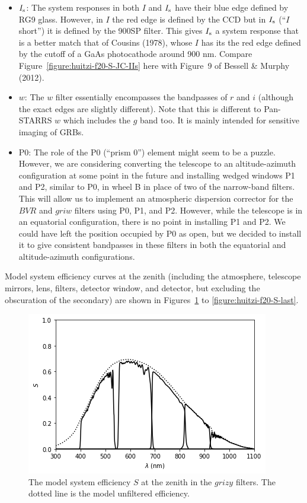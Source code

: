 \begin{itemize}
\item $\mbox{$I_\mathrm{s}$}$: The system responses in both $I$ and $\mbox{$I_\mathrm{s}$}$ have their blue edge defined by RG9 glass. However, in $I$ the red edge is defined by the CCD but in $\mbox{$I_\mathrm{s}$}$ (“$I$ short”) it is defined by the 900SP filter. This gives $\mbox{$I_\mathrm{s}$}$ a system response that is a better match that of Cousins (1978), whose $I$ has its the red edge defined by the cutoff of a GaAs photocathode around 900 nm. Compare Figure~\ref{figure:huitzi-f20-S-JC-IIs} here with Figure~9 of Bessell \& Murphy (2012).

\item
$w$: The $w$ filter essentially encompasses the bandpasses of $r$ and $i$ (although the exact edges are slightly different). Note that this is different to Pan-STARRS $w$ which includes the $g$ band too. It is mainly intended for sensitive imaging of GRBs.

\item P0: The role of the P0 (“prism 0”) element might seem to be a puzzle. However, we are considering converting the telescope to an altitude-azimuth configuration at some point in the future and installing wedged windows P1 and P2, similar to P0, in wheel B in place of two of the narrow-band filters. This will allow us to implement an atmospheric dispersion corrector  for the $BVR$ and $griw$ filters using P0, P1, and P2. However, while the telescope is in an equatorial configuration, there is no point in installing P1 and P2. We could have left the position occupied by P0 as open, but we decided to install it to give consistent bandpasses in these filters in both the equatorial and altitude-azimuth configurations.

\end{itemize}

Model system efficiency curves at the zenith (including the atmosphere, telescope mirrors, lens, filters, detector window, and detector, but excluding the obscuration of the secondary) are shown in Figures~\ref{figure:huitzi-f20-S-first} to \ref{figure:huitzi-f20-S-last}.

\begin{figure}
\begin{center}
\includegraphics[width=0.7\linewidth]{figures/huitzi-f20-S-grizy.png}
\medskip
\caption{The model system efficiency $S$ at the zenith in the $grizy$ filters. The dotted line is the model unfiltered efficiency.}
\label{figure:huitzi-f20-S-first}
\end{center}
\end{figure}

